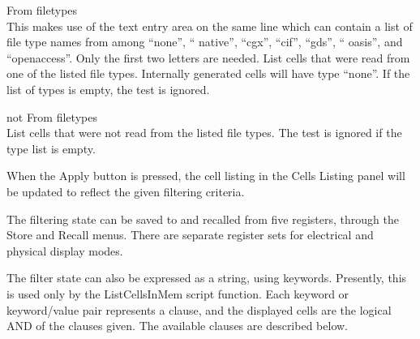 \begin{description}
\item{\cb From filetypes}\\
This makes use of the text entry area on the same line which can
contain a list of file type names from among ``{\vt none}'', ``{\vt
native}'', ``{\vt cgx}'', ``{\vt cif}'', ``{\vt gds}'', ``{\vt
oasis}'', and ``{\vt openaccess}''.  Only the first two letters are
needed.  List cells that were read from one of the listed file types. 
Internally generated cells will have type ``{\vt none}''.  If the list
of types is empty, the test is ignored.
\item{\cb not From filetypes}\\
List cells that were not read from the listed file types.  The test is
ignored if the type list is empty.
\end{description}

When the {\cb Apply} button is pressed, the cell listing in the {\cb
Cells Listing} panel will be updated to reflect the given filtering
criteria.

The filtering state can be saved to and recalled from five registers,
through the {\cb Store} and {\cb Recall} menus.  There are separate
register sets for electrical and physical display modes.

The filter state can also be expressed as a string, using keywords. 
Presently, this is used only by the {\vt ListCellsInMem} script
function.  Each keyword or keyword/value pair represents a clause, and
the displayed cells are the logical AND of the clauses given.  The
available clauses are described below.

